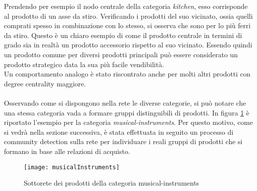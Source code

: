 Prendendo per esempio il nodo centrale della categoria \textit{kitchen}, esso corrisponde al prodotto di un asse da stiro. Verificando i prodotti del suo vicinato, ossia quelli comprati spesso in combinazione con lo stesso, si osserva che sono per lo più ferri da stiro. Questo è un chiaro esempio di come il prodotto centrale in termini di grado sia in realtà un prodotto accessorio rispetto al suo vicinato. Essendo quindi un prodotto comune per diversi prodotti principali può essere considerato un prodotto strategico data la sua più facile vendibilità. \\
Un comportamento analogo è stato riscontrato anche per molti altri prodotti con degree centrality maggiore.
\\\\
Osservando come si dispongono nella rete le diverse categorie, si può notare che una stessa categoria vada a formare gruppi distinguibili di prodotti. In figura \ref{fig:musicalInstruments} è riportato l'esempio per la categoria \textit{musical-instruments}. Per questo motivo, come si vedrà nella sezione successiva, è stata effettuata in seguito un processo di community detection sulla rete per individuare i reali gruppi di prodotti che si formano in base alle relazioni di acquisto.

\begin{figure}[H]
    \texttt{[image: musicalInstruments]}\centering
    \caption{Sottorete dei prodotti della categoria musical-instruments}\label{fig:musicalInstruments}
\end{figure}


